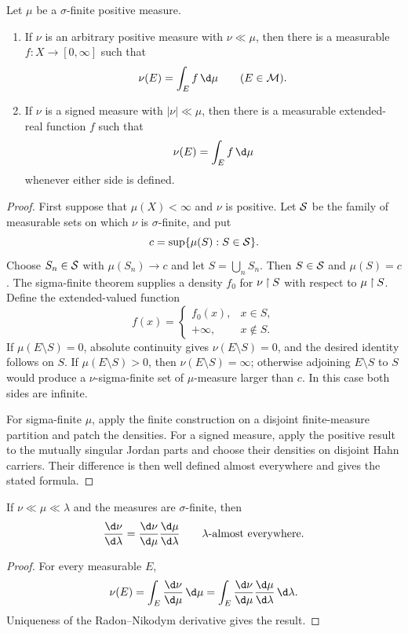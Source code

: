 \begin{thm}
Let $\mu$ be a $\sigma$-finite positive measure.
\begin{enumerate}
  \item If $\nu$ is an arbitrary positive measure with $\nu\ll\mu$, then there is a measurable $f:X\to[0,\infty]$ such that
  \[
  \nu(E)=\int_Ef\,\d\mu
  \qquad(E\in\cM).
  \]
  \item If $\nu$ is a signed measure with $|\nu|\ll\mu$, then there is a measurable extended-real function $f$ such that
  \[
  \nu(E)=\int_Ef\,\d\mu
  \]
  whenever either side is defined.
\end{enumerate}
\end{thm}

\begin{proof}
First suppose that $\mu(X)<\infty$ and $\nu$ is positive. Let $\mathcal{S}$ be the family of measurable sets on which $\nu$ is $\sigma$-finite, and put
\[
c=\sup\{\mu(S):S\in\mathcal{S}\}.
\]
Choose $S_n\in\mathcal{S}$ with $\mu(S_n)\to c$ and let $S=\bigcup_nS_n$. Then $S\in\mathcal{S}$ and $\mu(S)=c$. The sigma-finite theorem supplies a density $f_0$ for $\nu\mathbin{\upharpoonright} S$ with respect to $\mu\mathbin{\upharpoonright} S$. Define the extended-valued function
\[
f(x)=
\begin{cases}
f_0(x),&x\in S,\\
+\infty,&x\notin S.
\end{cases}
\]
If $\mu(E\setminus S)=0$, absolute continuity gives $\nu(E\setminus S)=0$, and the desired identity follows on $S$. If $\mu(E\setminus S)>0$, then $\nu(E\setminus S)=\infty$; otherwise adjoining $E\setminus S$ to $S$ would produce a $\nu$-sigma-finite set of $\mu$-measure larger than $c$. In this case both sides are infinite.

For sigma-finite $\mu$, apply the finite construction on a disjoint finite-measure partition and patch the densities. For a signed measure, apply the positive result to the mutually singular Jordan parts and choose their densities on disjoint Hahn carriers. Their difference is then well defined almost everywhere and gives the stated formula.
\end{proof}

\begin{prop}
If $\nu\ll\mu\ll\lambda$ and the measures are $\sigma$-finite, then
\[
\frac{\d\nu}{\d\lambda}
 =\frac{\d\nu}{\d\mu}\frac{\d\mu}{\d\lambda}
\qquad\lambda\text{-almost everywhere}.
\]
\end{prop}

\begin{proof}
For every measurable $E$,
\[
\nu(E)=\int_E\frac{\d\nu}{\d\mu}\,\d\mu
 =\int_E\frac{\d\nu}{\d\mu}\frac{\d\mu}{\d\lambda}\,\d\lambda.
\]
Uniqueness of the Radon--Nikodym derivative gives the result.
\end{proof}

